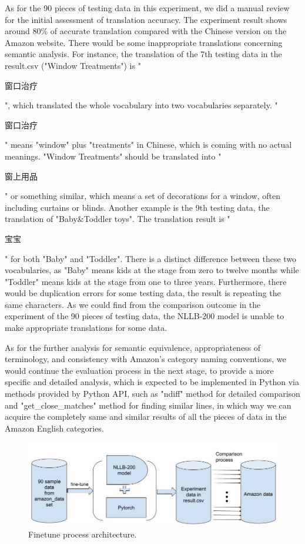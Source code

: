 \documentclass[sigconf]{acmart}
\begin{document}
As for the 90 pieces of testing data in this experiment, we did a manual review for the initial assessment of translation accuracy. The experiment result shows around 80\% of accurate translation compared with the Chinese version on the Amazon website. There would be some inappropriate translations concerning semantic analysis.\cite{palmer_wu_1995} For instance, the translation of the 7th testing data in the result.csv ("Window Treatments") is "\begin{CJK*}{UTF8}{gbsn}窗口治疗\end{CJK*}", which translated the whole vocabulary into two vocabularies separately. "\begin{CJK*}{UTF8}{gbsn}窗口治疗\end{CJK*}" means "window" plus "treatments" in Chinese, which is coming with no actual meanings. "Window Treatments" should be translated into "\begin{CJK*}{UTF8}{gbsn}窗上用品\end{CJK*}" or something similar, which means a set of decorations for a window, often including curtains or blinds.\cite{window_treatment_definition_meaning_yourdictionary} Another example is the 9th testing data, the translation of "Baby\&Toddler toys". The translation result is "\begin{CJK*}{UTF8}{gbsn}宝宝\end{CJK*}" for both "Baby" and "Toddler". There is a distinct difference between these two vocabularies, as "Baby" means kids at the stage from zero to twelve months while "Toddler" means kids at the stage from one to three years.\cite{american_academy_of_pediatrics_2019} Furthermore, there would be duplication errors for some testing data, the result is repeating the same characters.\cite{koponen_2010} As we could find from the comparison outcome in the experiment of the 90 pieces of testing data, the NLLB-200 model is unable to make appropriate translations for some data. 

As for the further analysis for semantic equivalence, appropriateness of terminology, and consistency with Amazon's category naming conventions, we would continue the evaluation process in the next stage, to provide a more specific and detailed analysis, which is expected to be implemented in Python via methods provided by Python API, such as "ndiff" method for detailed comparison and "get\_close\_matches" method for finding similar lines, \cite{difflib_helpers_for_computing-deltas_python_documentation}in which way we can acquire the completely same and similar results of all the pieces of data in the Amazon English categories.

\begin{figure}[t]
    \centering
    \includegraphics[width=1.1\linewidth]{illustrate_figure.jpeg}
    \caption{Finetune process architecture.}
    
\end{figure}



\end{document}
